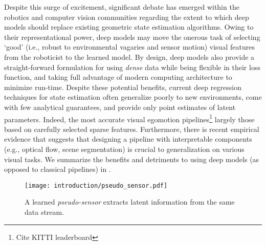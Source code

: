 Despite this surge of excitement, significant debate has emerged within the robotics and computer vision communities regarding the extent to which deep models should replace existing geometric state estimation algorithms. Owing to their representational power, deep models may move the onerous task of selecting `good' (i.e., robust to environmental vagaries and sensor motion) visual features from the roboticist to the learned model. By design, deep models also provide a straight-forward formulation for using \textit{dense} data while being flexible in their loss function, and taking full advantage of modern computing architecture to minimize run-time. Despite these potential benefits, current deep regression techniques for state estimation often generalize poorly to new environments, come with few analytical guarantees, and provide only point estimates of latent parameters. Indeed, the most accurate visual egomotion pipelines\footnote{Cite KITTI leaderboard} largely those based on carefully selected sparse features. Furthermore, there is recent empirical evidence \citep{Zhou2019-se} that suggests that designing a pipeline with interpretable components (e.g., optical flow, scene segmentation) is crucial to generalization on various visual tasks. We summarize the benefits and detriments to using deep models (as opposed to classical pipelines) in . 

\begin{figure}
\begin{center}
		\texttt{[image: introduction/pseudo\_sensor.pdf]}
		\caption{A learned \textit{pseudo-sensor} extracts latent information from the same data stream.}
  	\label{fig:intro_pseudo_sensor}
\end{center}
\end{figure}


